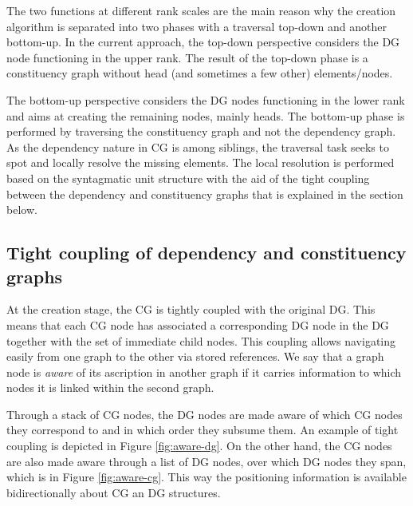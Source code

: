    The two functions at different rank scales are the main reason why the creation algorithm is separated into two phases with a traversal top-down and another bottom-up. In the current approach, the top-down perspective considers the DG node functioning in the upper rank. The result of the top-down phase is a constituency graph without head (and sometimes a few other) elements/nodes.

    The bottom-up perspective considers the DG nodes functioning in the lower rank and aims at creating the remaining nodes, mainly heads. The bottom-up phase is performed by traversing the constituency graph and not the dependency graph. As the dependency nature in CG is among siblings, the traversal task seeks to spot and locally resolve the missing elements. The local resolution is performed based on the syntagmatic unit structure with the aid of the tight coupling between the dependency and constituency graphs that is explained in the section below.

\subsection{Tight coupling of dependency and constituency graphs}
\label{sec:tight-coupling}
    At the creation stage, the CG is tightly coupled with the original DG. This means that each CG node has associated a corresponding DG node in the DG together with the set of immediate child nodes. This coupling allows navigating easily from one graph to the other via stored references. We say that a graph node is \textit{aware} of its ascription in another graph if it carries information to which nodes it is linked within the second graph.


    Through a stack of CG nodes, the DG nodes are made aware of which CG nodes they correspond to and in which order they subsume them. An example of tight coupling is depicted in Figure \ref{fig:aware-dg}. On the other hand, the CG nodes are also made aware through a list of DG nodes, over which DG nodes they span, which is in Figure \ref{fig:aware-cg}. This way the positioning information is available bidirectionally about CG an DG structures.

